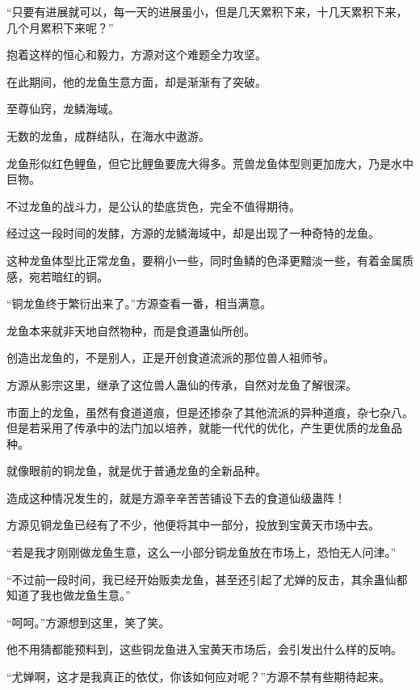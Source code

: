 \begin{this_body}
“只要有进展就可以，每一天的进展虽小，但是几天累积下来，十几天累积下来，几个月累积下来呢？”

抱着这样的恒心和毅力，方源对这个难题全力攻坚。

在此期间，他的龙鱼生意方面，却是渐渐有了突破。

至尊仙窍，龙鳞海域。

无数的龙鱼，成群结队，在海水中遨游。

龙鱼形似红色鲤鱼，但它比鲤鱼要庞大得多。荒兽龙鱼体型则更加庞大，乃是水中巨物。

不过龙鱼的战斗力，是公认的垫底货色，完全不值得期待。

经过这一段时间的发酵，方源的龙鳞海域中，却是出现了一种奇特的龙鱼。

这种龙鱼体型比正常龙鱼，要稍小一些，同时鱼鳞的色泽更黯淡一些，有着金属质感，宛若暗红的铜。

“铜龙鱼终于繁衍出来了。”方源查看一番，相当满意。

龙鱼本来就非天地自然物种，而是食道蛊仙所创。

创造出龙鱼的，不是别人，正是开创食道流派的那位兽人祖师爷。

方源从影宗这里，继承了这位兽人蛊仙的传承，自然对龙鱼了解很深。

市面上的龙鱼，虽然有食道道痕，但是还掺杂了其他流派的异种道痕，杂七杂八。但是若采用了传承中的法门加以培养，就能一代代的优化，产生更优质的龙鱼品种。

就像眼前的铜龙鱼，就是优于普通龙鱼的全新品种。

造成这种情况发生的，就是方源辛辛苦苦铺设下去的食道仙级蛊阵！

方源见铜龙鱼已经有了不少，他便将其中一部分，投放到宝黄天市场中去。

“若是我才刚刚做龙鱼生意，这么一小部分铜龙鱼放在市场上，恐怕无人问津。”

“不过前一段时间，我已经开始贩卖龙鱼，甚至还引起了尤婵的反击，其余蛊仙都知道了我也做龙鱼生意。”

“呵呵。”方源想到这里，笑了笑。

他不用猜都能预料到，这些铜龙鱼进入宝黄天市场后，会引发出什么样的反响。

“尤婵啊，这才是我真正的依仗，你该如何应对呢？”方源不禁有些期待起来。

\end{this_body}

